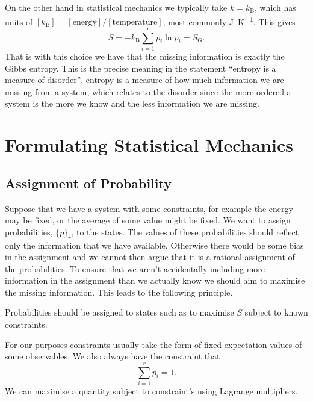\documentclass[fleqn]{NotesClass}
\newcommand*{\boltzmann}{k_{\mathrm{B}}}
\begin{document}
    On the other hand in statistical mechanics we typically take \(k = \boltzmann\), which has units of \([\boltzmann] = [\mathrm{energy}]/[\mathrm{temperature}]\), most commonly \unit{\joule \per \kelvin}.
    This gives
    \begin{equation}
        S = -\boltzmann \sum_{i=1}^{r} p_i\ln p_i = S_{\mathrm{G}}.
    \end{equation}
    That is with this choice we have that the missing information is exactly the Gibbs entropy.
    This is the precise meaning in the statement \enquote{entropy is a measure of disorder}, entropy is a measure of how much information we are missing from a system, which relates to the disorder since the more ordered a system is the more we know and the less information we are missing.
    
    \chapter{Formulating Statistical Mechanics}
    \section{Assignment of Probability}
    Suppose that we have a system with some constraints, for example the energy may be fixed, or the average of some value might be fixed.
    We want to assign probabilities, \(\{p\}_r\), to the states.
    The values of these probabilities should reflect only the information that we have available.
    Otherwise there would be some bias in the assignment and we cannot then argue that it is a rational assignment of the probabilities.
    To ensure that we aren't accidentally including more information in the assignment than we actually know we should aim to maximise the missing information.
    This leads to the following principle.
    \begin{important}
        Probabilities should be assigned to states such as to maximise \(S\) subject to known constraints.
    \end{important}
    
    For our purposes constraints usually take the form of fixed expectation values of some observables.
    We also always have the constraint that
    \begin{equation}
        \sum_{i=1}^{r} p_i = 1.
    \end{equation}
    We can maximise a quantity subject to constraint's using Lagrange multipliers.
    
\end{document}
